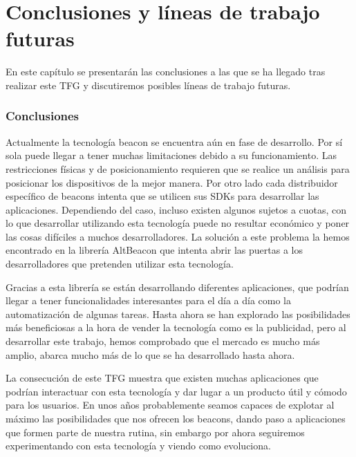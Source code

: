 %
%
%

\chapter{Conclusiones y líneas de trabajo futuras} \label{chap:Conclusiones} 

En este capítulo se presentarán las conclusiones a las que se ha llegado tras realizar este TFG y discutiremos posibles líneas de trabajo futuras.

\subsection{Conclusiones}

Actualmente la tecnología beacon se encuentra aún en fase de desarrollo. Por sí sola puede llegar a tener muchas limitaciones debido a su funcionamiento. Las restricciones físicas y de posicionamiento requieren que se realice un análisis para posicionar los dispositivos de la mejor manera. Por otro lado cada distribuidor específico de beacons intenta que se utilicen sus SDKs para desarrollar las aplicaciones. Dependiendo del caso, incluso existen algunos sujetos a cuotas, con lo que desarrollar utilizando esta tecnología puede no resultar económico y poner las cosas difíciles a muchos desarrolladores. La solución a este problema la hemos encontrado en la librería AltBeacon que intenta abrir las puertas a los desarrolladores que pretenden utilizar esta tecnología.


Gracias a esta librería se están desarrollando diferentes aplicaciones, que podrían llegar a tener funcionalidades interesantes para el día a día como la automatización de algunas tareas. Hasta ahora se han explorado las posibilidades más beneficiosas a la hora de vender la tecnología como es la publicidad, pero al desarrollar este trabajo, hemos comprobado que el mercado es mucho más amplio, abarca mucho más de lo que se ha desarrollado hasta ahora. 


La consecución de este TFG muestra que existen muchas aplicaciones que podrían interactuar con esta tecnología y dar lugar a un producto útil y cómodo para los usuarios. En unos años probablemente seamos capaces de explotar al máximo las posibilidades que nos ofrecen los beacons, dando paso a aplicaciones que formen parte de nuestra rutina, sin embargo por ahora seguiremos experimentando con esta tecnología y viendo como evoluciona.



